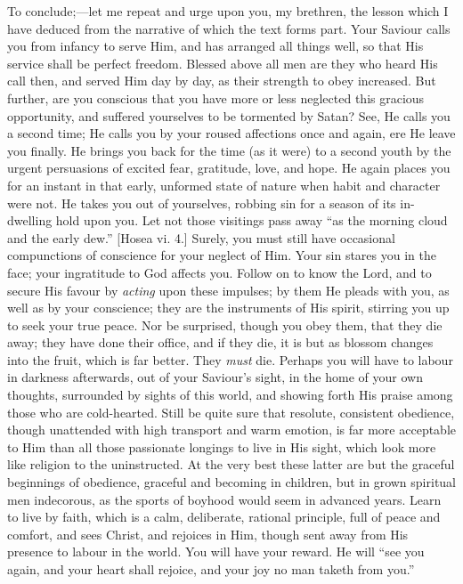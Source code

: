To conclude;—let me repeat and urge upon you, my
brethren, the lesson which I have deduced from the
narrative of which the text forms part. Your Saviour
calls you from infancy to serve Him, and has arranged all
things well, so that His service shall be perfect
freedom. Blessed above all men are they who heard His
call then, and served Him day by day, as their strength
to obey increased. But further, are you conscious that
you have more or less neglected this gracious
opportunity, and suffered yourselves to be tormented by
Satan? See, He calls you a second time; He calls you by
your roused affections once and again, ere He leave you finally. He brings you back for the time (as it were) to
a second youth by the urgent persuasions of excited fear,
gratitude, love, and hope. He again places you for an
instant in that early, unformed state of nature when
habit and character were not. He takes you out of
yourselves, robbing sin for a season of its in-dwelling
hold upon you. Let not those visitings pass away ``as
the morning cloud and the early dew.'' [Hosea vi. 4.]
Surely, you must still have occasional compunctions of
conscience for your neglect of Him. Your sin stares you
in the face; your ingratitude to God affects you. Follow
on to know the Lord, and to secure His favour by \emph{acting}
upon these impulses; by them He pleads with you, as well
as by your conscience; they are the instruments of His
spirit, stirring you up to seek your true peace. Nor be
surprised, though you obey them, that they die away; they
have done their office, and if they die, it is but as
blossom changes into the fruit, which is far better. They
\emph{must} die. Perhaps you will have to labour in
darkness afterwards, out of your Saviour's sight, in the
home of your own thoughts, surrounded by sights of this
world, and showing forth His praise among those who are
cold-hearted. Still be quite sure that resolute,
consistent obedience, though unattended with high
transport and warm emotion, is far more acceptable to Him
than all those passionate longings to live in His sight,
which look more like religion to the uninstructed. At the
very best these latter are but the graceful beginnings of
obedience, graceful and becoming in children, but in
grown spiritual men indecorous, as the sports of boyhood
would seem in advanced years. Learn to live by faith,
which is a calm, deliberate, rational principle, full of
peace and comfort, and sees Christ, and rejoices in Him,
though sent away from His presence to labour in the
world. You will have your reward. He will ``see you
again, and your heart shall rejoice, and your joy no man
taketh from you.''

